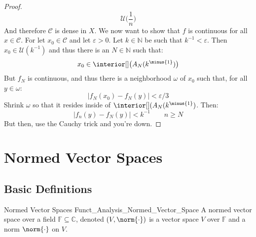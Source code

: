 \begin{proof}
\begin{equation}
                    \mathcal{U}\big(\frac{1}{n}\big)
            \end{equation}
            And therefore $\mathcal{C}$ is dense in $X$. We
            now want to show that $f$ is continuous for all
            $x\in\mathcal{C}$. For let $x_{0}\in\mathcal{C}$ and
            let $\varepsilon>0$. Let $k\in\mathbb{N}$ be such that
            $k^{\minus{1}}<\varepsilon$. Then
            $x_{0}\in\mathcal{U}(k^{\minus{1}})$ and thus there is
            an $N\in\mathbb{N}$ such that:
            \begin{equation}
                x_{0}\in\interior[]\big(A_{N}(k^{\minus{1}})\big)
            \end{equation}
            But $f_{N}$ is continuous, and thus there is a
            neighborhood $\omega$ of $x_{0}$ such that, for all
            $y\in\omega$:
            \begin{equation}
                |f_{N}(x_{0})-f_{N}(y)|<\varepsilon/3
            \end{equation}
            Shrink $\omega$ so that it resides inside of
            $\interior[](A_{N}(k^{\minus{1}})$. Then:
            \begin{equation}
                |f_{n}(y)-f_{N}(y)|<k^{\minus{1}}
                \quad\quad
                n\geq{N}
            \end{equation}
            But then, use the Cauchy trick and you're down.
        \end{proof}
        \newpage
    \section{Normed Vector Spaces}
        \subsection{Basic Definitions}
            \begin{ldefinition}{Normed Vector Spaces}
                  {Funct_Analysis_Normed_Vector_Space}
                A normed vector space over a field
                $\mathbb{F}\subseteq\mathbb{C}$, denoted
                $(V,\norm{\cdot})$ is a vector space $V$ over
                $\mathbb{F}$ and a norm $\norm{\cdot}$ on $V$.
            \end{ldefinition}
